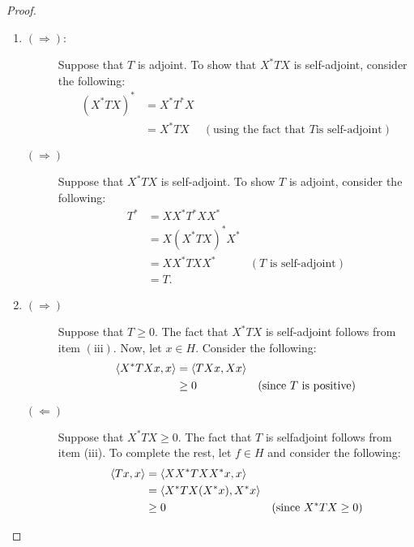 \begin{proof}
\begin{enumerate}[label=(\roman*)]
	    This completes the proof.
	\item 
	    \begin{description}
		\item[$\left( \Longrightarrow \right)$:] Suppose that $T$ is adjoint. To show that $X^{*}TX$ is self-adjoint, consider the following:
		    \begin{align*}
			\left( X^{*}TX \right)^{*} &= X^{*}T^{*}X \\
		&= X^{*}T X & (\text{using the fact that } T \text{is self-adjoint})
		    \end{align*}
		\item[$\left( \Longrightarrow \right)$] Suppose that $X^{*}TX$ is self-adjoint. To show $T$ is adjoint, consider the following:
		    \begin{align*}
			T^{*} &= XX^{*}T^{*}XX^{*} \\
			&= X\left( X^{*}TX \right)^{*} X^{*} \\
			&= XX^{*}TXX^{*} & (T\text{ is self-adjoint}) \\
			&= T.
		    \end{align*}
	    \end{description}

	\item 
	    \begin{description}
		\item[$\left( \Longrightarrow \right)$] Suppose that $T\ge 0$. The fact that $X^{*}TX$ is self-adjoint follows from item $\left( \text{iii} \right)$. Now, let $x\in H$. Consider the following:
		    \begin{align*}
			\left\langle X^{*}TXx,x \right\rangle &= \left\langle TXx, Xx \right\rangle \\
		    &\ge 0 & (\text{since } T \text{ is positive})
		    \end{align*}
		\item[$\left( \Longleftarrow \right)$] Suppose that $X^{*}TX\ge0$. The fact that $T$ is selfadjoint follows from item (iii). To complete the rest, let $f\in H$ and consider the following:
		    \begin{align*}
			\left\langle Tx,x \right\rangle &= \left\langle XX^{*}TXX^{*}x,x \right\rangle \\
			&= \left\langle X^{*}TX(X^{*}x), X^{*}x \right\rangle \\
		    & \ge 0 & (\text{since } X^{*}TX \ge 0)
		    \end{align*}
	    \end{description}


\end{enumerate}
\end{proof}
